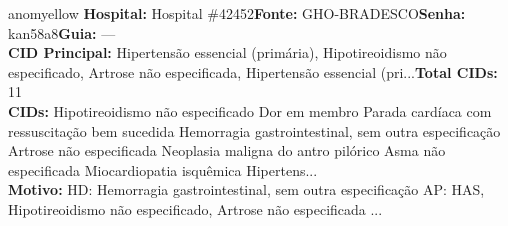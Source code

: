 \documentclass[a4paper,10pt]{article}
\begin{document}
\begin{anomalycard}[Interna\c{c}\~{a}o \#120282 | Pac. \#99715 | MODERADO (z=2.63) | LOS: 2d | 07/03/2026\,$\to$\,09/03/2026]{anomyellow}
\textbf{Hospital:} Hospital \#42452\quad \textbf{Fonte:} GHO-BRADESCO\quad \textbf{Senha:} kan58a8\quad \textbf{Guia:} ---\\

\textbf{CID Principal:} {\small Hipertensão essencial (primária), Hipotireoidismo não especificado, Artrose não especificada, Hipertensão essencial (pri...}\quad\textbf{Total CIDs:} 11\\

\textbf{CIDs:} {\scriptsize Hipotireoidismo não especificado \textbar{} Dor em membro \textbar{} Parada cardíaca com ressuscitação bem sucedida \textbar{} Hemorragia gastrointestinal, sem outra especificação \textbar{} Artrose não especificada \textbar{} Neoplasia maligna do antro pilórico \textbar{} Asma não especificada \textbar{} Miocardiopatia isquêmica \textbar{} Hipertens...}\\

\textbf{Motivo:} {\scriptsize HD:  Hemorragia gastrointestinal, sem outra especificação  AP: HAS,  Hipotireoidismo não especificado,  Artrose não especificada ...}\\




\end{anomalycard}
\end{document}
